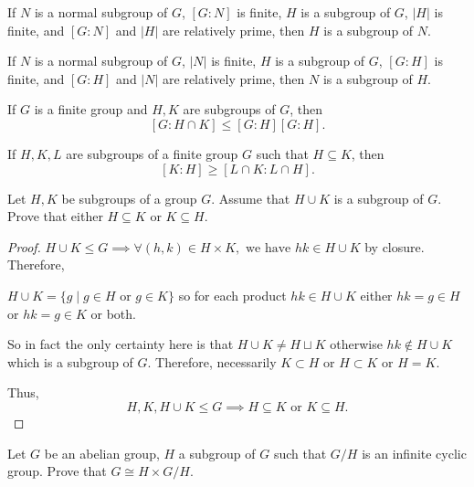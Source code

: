 \documentclass[addpoints,10pt]{exam}
\theoremstyle{plain}
\theoremstyle{definition}
\newtheorem{prob}[thm]{Problem}
\theoremstyle{plain}
\theoremstyle{plain}
\theoremstyle{definition}
\let\oldprob\prob
\let\endoldprob\endprob
\renewenvironment{prob}
  {\begin{singlespace}\oldprob}
  {\endoldprob\end{singlespace}}
\begin{document}
\begin{prob}
If $N$ is a normal subgroup of $G$, $[G:N]$ is finite, $H$ is a subgroup of $G$, $|H|$ is finite, and $[G:N]$ and $|H|$ are relatively prime, then $H$ is a subgroup of $N$.
\end{prob}

\begin{prob}
If $N$ is a normal subgroup of $G$, $|N|$ is finite, $H$ is a subgroup of $G$, $[G:H]$ is finite, and $[G:H]$ and $|N|$ are relatively prime, then $N$ is a subgroup of $H$.
\end{prob}

\begin{prob}
If $G$ is a finite group and $H,K$ are subgroups of $G$, then
\[
[G:H\cap K] \le [G:H][G:H].
\]
\end{prob}

\begin{prob}
If $H,K,L$ are subgroups of a finite group $G$ such that $H\subseteq K$, then
\[
[K:H] \ge [L\cap K : L\cap H].
\]
\end{prob}
\newpage
\begin{prob}
  Let $H,K$ be subgroups of a group $G$. Assume that $H\cup K$ is a subgroup of $G$. Prove that either $H\subseteq K$ or $K\subseteq H$.
\end{prob}

\begin{proof}
  $H\cup K\leq G\implies \forall (h,k)\in H\times K,\text{ we have }hk\in H\cup K$ by closure. Therefore,
  \begin{center} 
    $H\cup K=\{g\mid g\in H\text{ or }g\in K\}$ so for each product $hk\in H\cup K$ either $hk=g\in H$ or $hk=g\in K$ or both.
  \end{center}
  So in fact the only certainty here is that $H\cup K\neq H\sqcup K$ otherwise $hk\notin H\cup K$ which is a subgroup of $G$. Therefore, necessarily $K\subset H$ or $H\subset K$ or $H=K$.

  Thus,
  $$H,K,H\cup K\leq G\implies H\subseteq K\text{ or }K\subseteq H.$$
\end{proof}
\begin{prob}
Let $G$ be an abelian group, $H$ a subgroup of $G$ such that $G/H$ is an infinite cyclic group. Prove that $G \cong H \times G/H$.
\end{prob}
\end{document}
